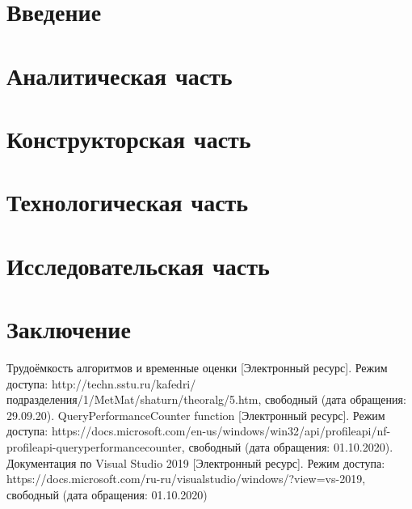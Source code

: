 \documentclass[12pt]{report}
\begin{document}
	\renewcommand\bibname{Список литературы}
	
	
	
	\tableofcontents
	\newpage
	
	\chapter*{Введение}
	
	\newpage
	
	\chapter{Аналитическая часть}
	
	\newpage
	
	\chapter{Конструкторская часть}
	
	\newpage
	
	\chapter{Технологическая часть}
	
	\newpage
	
	\chapter{Исследовательская часть}
	
	\newpage
	
	\chapter*{Заключение}
	
	\newpage
	
	\begin{thebibliography}{2}
		 Трудоёмкость алгоритмов и временные оценки [Электронный ресурс]. Режим доступа: http://techn.sstu.ru/kafedri/подразделения/1/MetMat/shaturn/theoralg/5.htm, свободный (дата обращения: 29.09.20).
		 QueryPerformanceCounter function [Электронный ресурс]. Режим доступа: https://docs.microsoft.com/en-us/windows/win32/api/profileapi/nf-profileapi-queryperformancecounter, свободный (дата обращения: 01.10.2020).
		 Документация по Visual Studio 2019 [Электронный ресурс]. Режим доступа: https://docs.microsoft.com/ru-ru/visualstudio/windows/?view=vs-2019, свободный (дата обращения: 01.10.2020)
	\end{thebibliography}
\end{document}
